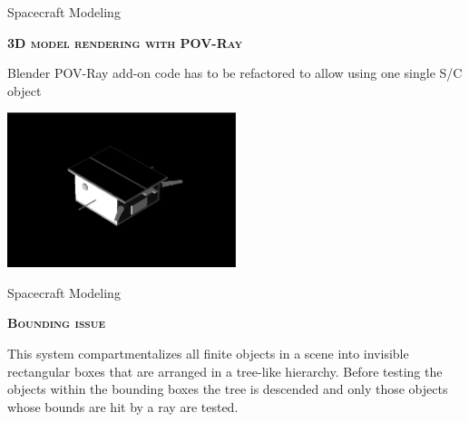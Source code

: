 \documentclass[10pt]{beamer}
\begin{document}
\begin{frame}{Spacecraft Modeling}

  \bigskip

  \textsc{\textbf{\large 3D model rendering with POV-Ray}}

  \bigskip

  Blender POV-Ray add-on code has to be refactored to allow using one single S/C object 

  \bigskip

  \centering
  \includegraphics[width=0.5\textwidth]{gfx/tango_1.eps}

  \bigskip

\end{frame}

\begin{frame}{Spacecraft Modeling}

  \bigskip

  \textsc{\textbf{\large Bounding issue}}

  \bigskip

This system compartmentalizes all finite objects in a scene into invisible rectangular boxes that are arranged in a tree-like hierarchy. Before testing the objects within the bounding boxes the tree is descended and only those objects whose bounds are hit by a ray are tested.

  \smallskip

  \begin{figure}
    \captionsetup[subfigure]{labelformat=empty}
    \centering
    \qquad
    \qquad
  \end{figure}

  \bigskip
\end{frame}
\end{document}
